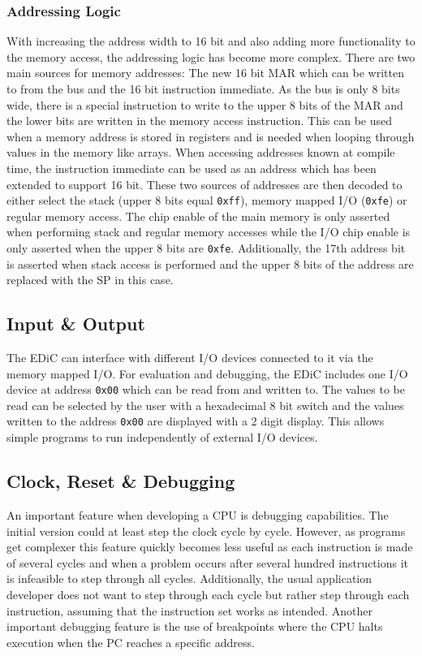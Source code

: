 \subsubsection{Addressing Logic}\label{sec:addrLogic}
With increasing the address width to 16 bit and also adding more functionality to the memory access, the addressing logic has become more complex.
There are two main sources for memory addresses: The new 16 bit \gls{MAR} which can be written to from the bus and the 16 bit instruction immediate.
As the bus is only 8 bits wide, there is a special instruction to write to the upper 8 bits of the \gls{MAR} and the lower bits are written in the memory access instruction.
This can be used when a memory address is stored in registers and is needed when looping through values in the memory like arrays.
When accessing addresses known at compile time, the instruction immediate can be used as an address which has been extended to support 16 bit.
These two sources of addresses are then decoded to either select the stack (upper 8 bits equal \texttt{0xff}), memory mapped I/O (\texttt{0xfe}) or regular memory access.
The chip enable of the main memory is only asserted when performing stack and regular memory accesses while the I/O chip enable is only asserted when the upper 8 bits are \texttt{0xfe}.
Additionally, the 17th address bit is asserted when stack access is performed and the upper 8 bits of the address are replaced with the \gls{SP} in this case.

\subsection{Input \& Output}\label{sec:IO}
The \gls{EDiC} can interface with different I/O devices connected to it via the memory mapped I/O.
For evaluation and debugging, the \gls{EDiC} includes one I/O device at address \texttt{0x00} which can be read from and written to.
The values to be read can be selected by the user with a hexadecimal 8 bit switch and the values written to the address \texttt{0x00} are displayed with a 2 digit display.
This allows simple programs to run independently of external I/O devices.

\subsection{Clock, Reset \& Debugging}
An important feature when developing a \gls{CPU} is debugging capabilities.
The initial version could at least step the clock cycle by cycle.
However, as programs get complexer this feature quickly becomes less useful as each instruction is made of several cycles and when a problem occurs after several hundred instructions it is infeasible to step through all cycles.
Additionally, the usual application developer does not want to step through each cycle but rather step through each instruction, assuming that the instruction set works as intended.
Another important debugging feature is the use of breakpoints where the \gls{CPU} halts execution when the \gls{PC} reaches a specific address.

